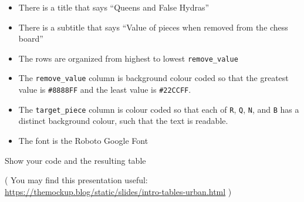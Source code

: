 \documentclass[
]{article}
\providecommand{\tightlist}{%
  \setlength{\itemsep}{0pt}\setlength{\parskip}{0pt}}
\begin{document}
\begin{itemize}
\tightlist
\item
  There is a title that says ``Queens and False Hydras''
\item
  There is a subtitle that says ``Value of pieces when removed from the
  chess board''
\item
  The rows are organized from highest to lowest \texttt{remove\_value}
\item
  The \texttt{remove\_value} column is background colour coded so that
  the greatest value is \texttt{\#8888FF} and the least value is
  \texttt{\#22CCFF}.
\item
  The \texttt{target\_piece} column is colour coded so that each of
  \texttt{R}, \texttt{Q}, \texttt{N}, and \texttt{B} has a distinct
  background colour, such that the text is readable.
\item
  The font is the Roboto Google Font
\end{itemize}

Show your code and the resulting table

( You may find this presentation useful:
\url{https://themockup.blog/static/slides/intro-tables-urban.html} )
\end{document}
